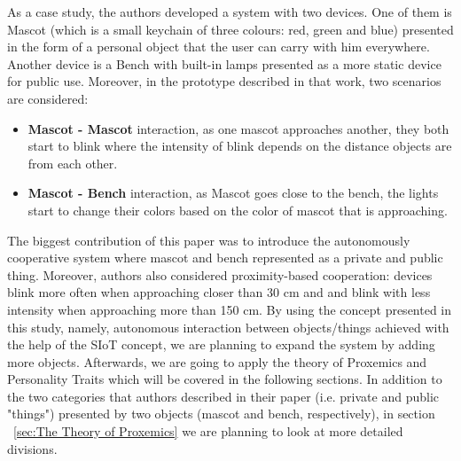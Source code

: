 \par As a case study, the authors developed a system with two devices.
One of them is Mascot (which is a small keychain of three colours:
red, green and blue) presented in the form of a personal object that the user can carry with him everywhere.
Another device is a Bench with built-in lamps presented as a more static device for public use.
Moreover, in the prototype described in that work, two scenarios are considered:
\begin{itemize}
  \item \textbf{Mascot - Mascot} interaction, as one mascot approaches another, they both start to blink where the intensity of blink depends on the distance objects are from each other.
  \item \textbf{Mascot - Bench} interaction, as Mascot goes close to the bench, the lights start to change their colors based on the color of mascot that is approaching.
\end{itemize}
The biggest contribution of this paper was to introduce the autonomously cooperative
system where mascot and bench represented as a private and public thing.
Moreover, authors also considered proximity-based cooperation: devices blink more often when
approaching closer than 30 cm and and blink with less intensity when approaching more than 150 cm.
By using the concept presented in this study, namely, autonomous interaction between objects/things
achieved with the help of the SIoT concept, we are planning to expand the system by adding more objects.
Afterwards, we are going to apply the theory of Proxemics and Personality
Traits which will be covered in the following sections.
In addition to the two categories that authors described in their paper (i.e. private and public "things")
presented by two objects (mascot and bench, respectively), in section ~\ref{sec:The Theory of Proxemics}
we are planning to look at more detailed divisions.

